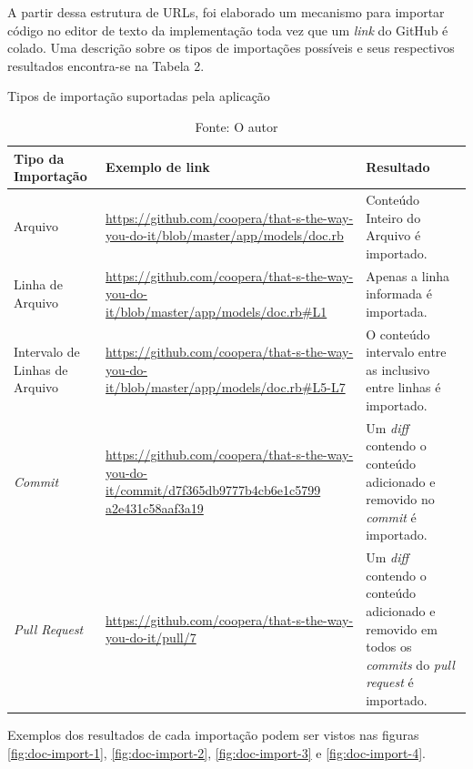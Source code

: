 A partir dessa estrutura de URLs, foi elaborado um mecanismo para importar código no editor de texto da implementação toda vez que um \textit{link} do GitHub é colado. Uma descrição sobre os tipos de importações possíveis e seus respectivos resultados encontra-se na Tabela 2.

\begin{table}[ht]
\centering
    \caption{Tipos de importação suportadas pela aplicação}
    \label{my-label}
    \begin{tabular}{p{3cm} | p{7cm} | p{5cm}}
    \hline
    Tipo da Importação & Exemplo de link & Resultado \\ \hline
    Arquivo & \url{https://github.com/coopera/that-s-the-way-you-do-it/blob/master/app/models/doc.rb} & Conteúdo Inteiro do Arquivo é importado. \\ \hline
    Linha de Arquivo & \url{https://github.com/coopera/that-s-the-way-you-do-it/blob/master/app/models/doc.rb\#L1} & Apenas a linha informada é importada. \\ \hline
    Intervalo de Linhas de Arquivo & \url{https://github.com/coopera/that-s-the-way-you-do-it/blob/master/app/models/doc.rb\#L5-L7} & O conteúdo intervalo entre as inclusivo entre linhas é importado. \\ \hline
    \textit{Commit} & \url{https://github.com/coopera/that-s-the-way-you-do-it/commit/d7f365db9777b4cb6e1c5799}
    \url{a2e431c58aaf3a19} & Um \textit{diff} contendo o conteúdo adicionado e removido no \textit{commit} é importado. \\ \hline
    \textit{Pull Request} & \url{https://github.com/coopera/that-s-the-way-you-do-it/pull/7} & Um \textit{diff} contendo o conteúdo adicionado e removido em todos os \textit{commits} do \textit{pull request} é importado.  \\ \hline
\end{tabular}
\caption*{Fonte: O autor}
\end{table}

\clearpage

Exemplos dos resultados de cada importação podem ser vistos nas figuras \ref{fig:doc-import-1}, \ref{fig:doc-import-2}, \ref{fig:doc-import-3} e \ref{fig:doc-import-4}.


